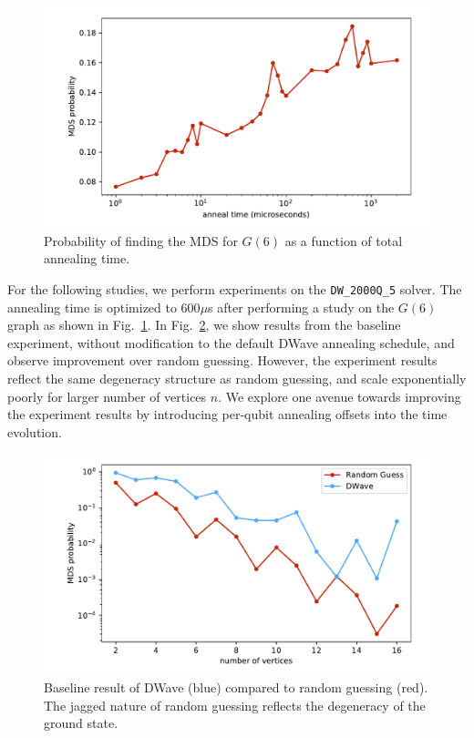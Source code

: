 \documentclass[prd,twocolumn,tightenlines,preprintnumbers,showpacs,superscriptaddress,notitlepage,nofootinbib,eqsecnum,floatfix,longbibliography]{revtex4}
\begin{document}
\begin{figure}[b]
	\centering
	\includegraphics[width=\columnwidth]{./figures/anneal_time_scaling.pdf}
	\caption{Probability of finding the MDS for $G(6)$ as a function of total annealing time.}
	\label{fig:at_scale}
\end{figure}

For the following studies, we perform experiments on the \texttt{DW\_2000Q\_5} solver. The annealing time is optimized to 600$\mu$s after performing a study on the $G(6)$ graph as shown in Fig.~\ref{fig:at_scale}. In Fig.~\ref{fig:baseline}, we show results from the baseline experiment, without modification to the default DWave annealing schedule, and observe improvement over random guessing. However, the experiment results reflect the same degeneracy structure as random guessing, and scale exponentially poorly for larger number of vertices $n$. We explore one avenue towards improving the experiment results by introducing per-qubit annealing offsets into the time evolution.

\begin{figure}
	\centering
	\includegraphics[width=\columnwidth]{./figures/scaling_baseline.pdf}
	\caption{Baseline result of DWave (blue) compared to random guessing (red). The jagged nature of random guessing reflects the degeneracy of the ground state.}
	\label{fig:baseline}
\end{figure}
\end{document}
